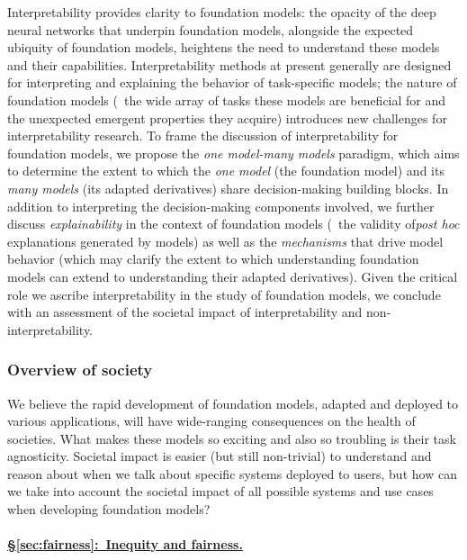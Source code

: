 Interpretability provides clarity to foundation models: the opacity of the deep neural networks that underpin foundation models, alongside the expected ubiquity of foundation models, heightens the need to understand these models and their capabilities.
Interpretability methods at present generally are designed for interpreting and explaining the behavior of task-specific models; the nature of foundation models (\ie~the wide array of tasks these models are beneficial for and the unexpected emergent properties they acquire) introduces new challenges for interpretability research.
To frame the discussion of interpretability for foundation models, we propose the \textit{one model-many models} paradigm, which aims to determine the extent to which the \textit{one model} (the foundation model) and its \textit{many models} (its adapted derivatives) share decision-making building blocks.
In addition to interpreting the decision-making components involved, we further discuss \textit{explainability} in the context of foundation models (\eg~the validity of\textit{post hoc} explanations generated by models) as well as the \textit{mechanisms} that drive model behavior (which may clarify the extent to which understanding foundation models can extend to understanding their adapted derivatives). 
Given the critical role we ascribe interpretability in the study of foundation models, we conclude with an assessment of the societal impact of interpretability and non-interpretability. 

\subsubsection{Overview of society}

We believe the rapid development of foundation models, adapted and
deployed to various applications, will have wide-ranging consequences on the
health of societies.  What makes these models so exciting and also so troubling
is their task agnosticity.  Societal impact is easier (but still non-trivial)
to understand and reason about when we talk about specific systems deployed to
users, but how can we take into account the societal impact of all
possible systems and use cases when developing foundation models?

\paragraph{\hyperref[sec:fairness]{§\ref{sec:fairness}:~Inequity and fairness.}}

